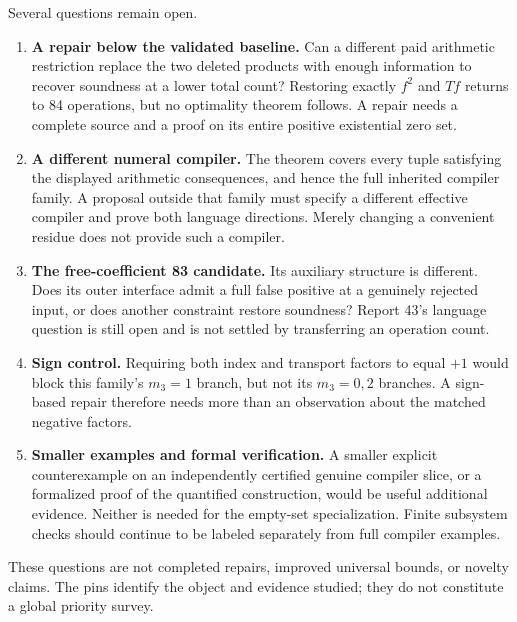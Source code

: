\documentclass[11pt,letterpaper]{article}
\newcommand{\fupR}{0}
\renewcommand{\thesection}{\fupR.\arabic{section}}
\renewcommand{\theHsection}{\fupR.\arabic{section}}
\newcommand{\fupappendix}{%
  \setcounter{section}{0}%
  \renewcommand{\thesection}{\fupR.\Alph{section}}%
  \renewcommand{\theHsection}{\fupR.\Alph{section}}}
\theoremstyle{definition}\newtheorem{definition}[theorem]{Definition}
\theoremstyle{remark}\newtheorem{remark}[theorem]{Remark}
\begin{document}
Several questions remain open.
\begin{enumerate}
\item \textbf{A repair below the validated baseline.}
Can a different paid arithmetic restriction replace the two deleted
products with enough information to recover soundness at a lower
total count? Restoring exactly $f^2$ and $Tf$ returns to 84 operations,
but no optimality theorem follows. A repair needs a complete source
and a proof on its entire positive existential zero set.
\item \textbf{A different numeral compiler.}
The theorem covers every tuple satisfying the displayed arithmetic
consequences, and hence the full inherited compiler family. A proposal
outside that family must specify a different effective compiler and
prove both language directions. Merely changing a convenient
residue does not provide such a compiler.
\item \textbf{The free-coefficient 83 candidate.}
Its auxiliary structure is different. Does its outer interface admit
a full false positive at a genuinely rejected input, or does another
constraint restore soundness? Report 43's language question is still
open and is not settled by transferring an operation count.
\item \textbf{Sign control.}
Requiring both index and transport factors to equal $+1$ would block
this family's $m_3=1$ branch, but not its $m_3=0,2$ branches.
A sign-based repair therefore needs more than an observation about
the matched negative factors.
\item \textbf{Smaller examples and formal verification.}
A smaller explicit counterexample on an independently certified genuine
compiler slice, or a formalized proof of the quantified construction,
would be useful additional evidence. Neither is needed for the
empty-set specialization. Finite subsystem checks should continue
to be labeled separately from full compiler examples.
\end{enumerate}
These questions are not completed repairs, improved universal bounds,
or novelty claims. The pins identify the object and evidence studied;
they do not constitute a global priority survey.

\fupappendix
\end{document}
